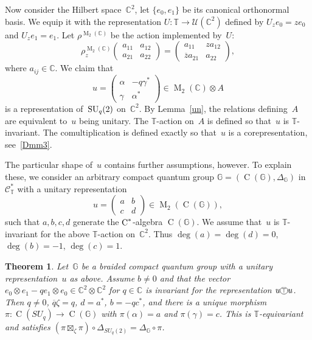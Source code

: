 \documentclass[a4paper]{amsart}
\numberwithin{equation}{section}
\newtheorem{Thm}{Theorem}[section]
\theoremstyle{definition}
\theoremstyle{remark}
\begin{document}
Now consider the Hilbert space~${{\mathbb C}}^2$, let $\{e_0,e_1\}$ be its
canonical orthonormal basis.  We equip it with the representation
$U\colon \mathbb{T}\rightarrow\mathcal{U}({{\mathbb C}}^2)$ defined by $U_z e_0 =
ze_0$ and $U_z e_1 = e_1$.  Let $\rho^{{\operatorname{M}}_2({{\mathbb C}})}$ be the action
implemented by~$U$:
\[
\rho^{{\operatorname{M}}_2({{\mathbb C}})}_z
\begin{pmatrix}
  a_{11}&a_{12}\\a_{21}&a_{22}
\end{pmatrix}
= \begin{pmatrix} a_{11}&za_{12} \\ \overline{z}a_{21} &a_{22}
\end{pmatrix},
\]
where $a_{ij}\in{{\mathbb C}}$.  We claim that
\[
u = \begin{pmatrix} \alpha&-q\gamma^{*}\\\gamma&\alpha^{*}
\end{pmatrix}
\in{\operatorname{M}}_2({{\mathbb C}})\otimes A
\]
is a representation of~${\textup{SU}}_q(2)$ on~${{\mathbb C}}^2$.  By Lemma~\ref{un},
the relations defining~$A$ are equivalent to~$u$ being unitary.  The
\(\mathbb{T}\){\nobreakdash}-action on~\(A\) is defined so that~\(u\) is
\(\mathbb{T}\){\nobreakdash}-invariant.  The comultiplication is defined exactly
so that~\(u\) is a corepresentation, see~\eqref{Dmm3}.

The particular shape of~$u$ contains further assumptions, however.  To
explain these, we consider an arbitrary compact quantum group
${\mathbb{G}}=(\operatorname{C}({\mathbb{G}}),\Delta_{\mathbb{G}})$ in~$\mathcal{C}^*_{\mathbb{T}}$ with a
unitary representation
\[
u = \begin{pmatrix} a&b\\c&d \end{pmatrix} \in {\operatorname{M}}_2(\operatorname{C}({\mathbb{G}})),
\]
such that $a,b,c,d$ generate the ${\textup{C}^*}$-algebra $\operatorname{C}({\mathbb{G}})$.  We
assume that~$u$ is $\mathbb T${\nobreakdash}-invariant for the above $\mathbb
T${\nobreakdash}-action on~${{\mathbb C}}^2$.  Thus $\deg(a) = \deg(d) =0$,
$\deg(b)=-1$, $\deg(c) =1$.

\begin{Thm}
  \label{the:SU_q_invariant_universal}
  Let~${\mathbb{G}}$ be a braided compact quantum group with a unitary
  representation~$u$ as above.  Assume $b\neq0$ and that the vector
  $e_0\otimes e_1-qe_1\otimes e_0 \in {{\mathbb C}}^2\otimes{{\mathbb C}}^2$ for
  \(q\in{{\mathbb C}}\) is invariant for the representation $u{\mathbin{\xymatrix{*+<.7ex>[o][F-]{\scriptstyle\top}}}} u$.  Then
  \(q\neq0\), ${\overline{q}}\zeta=q$, $d = a^*$, $b = -qc^*$, and there is a
  unique morphism $\pi\colon \operatorname{C}(SU_q) \rightarrow\operatorname{C}({\mathbb{G}})$ with
  $\pi(\alpha) =a$ and $\pi(\gamma) =c$.  This is
  $\mathbb{T}${\nobreakdash}-equivariant and satisfies
  $(\pi\boxtimes_\zeta\pi)\circ\Delta_{SU_q(2)} =
  \Delta_{\mathbb{G}}\circ\pi$.
\end{Thm}
\end{document}
